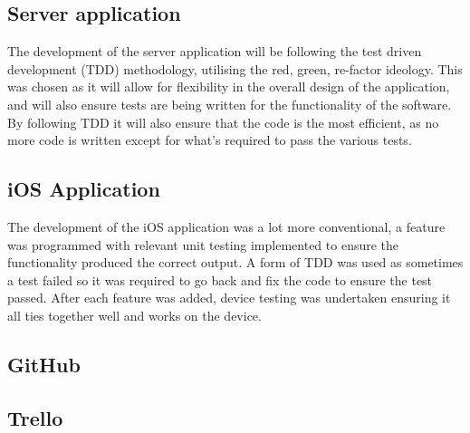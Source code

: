 	\subsection{Server application}
		The development of the server application will be following the test driven development (TDD) methodology, utilising the red, green, re-factor ideology. This was chosen as it will allow for flexibility in the overall design of the application, and will also ensure tests are being written for the functionality of the software. By following TDD it will also ensure that the code is the most efficient, as no more code is written except for what's required to pass the various tests. 

	\subsection{iOS Application}
		The development of the iOS application was a lot more conventional, a feature was programmed with relevant unit testing implemented to ensure the functionality produced the correct output. A form of TDD was used as sometimes a test failed so it was required to go back and fix the code to ensure the test passed. After each feature was added, device testing was undertaken ensuring it all ties together well and works on the device.  
	
	\subsection{GitHub}
		
	\subsection{Trello}